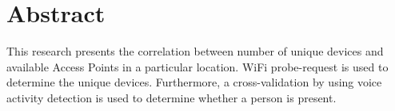 \begingroup
\let\clearpage\relax
\let\cleardoublepage\relax
\let\cleardoublepage\relax

\chapter*{Abstract}
This research presents the correlation between number of unique devices and available Access Points in a particular location. WiFi probe-request is used to determine the unique devices. Furthermore, a cross-validation by using voice activity detection is used to determine whether a person is present.

\endgroup			

\vfill